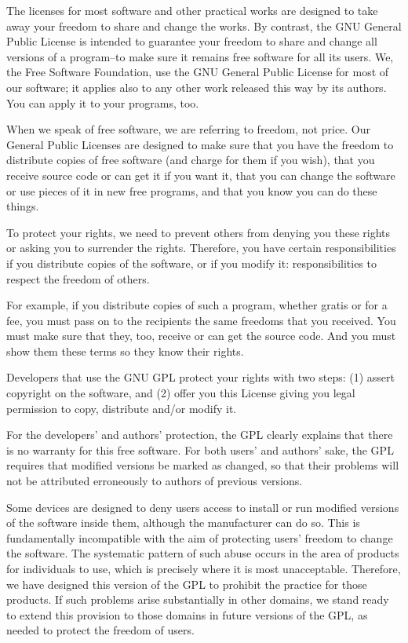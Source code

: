 \documentclass[a4paper, 11pt, twoside]{article}
\begin{document}
The licenses for most software and other practical works are designed to take away your freedom to share and change the works. By contrast, the GNU General Public License is intended to guarantee your freedom to share and change all versions of a program--to make sure it remains free software for all its users. We, the Free Software Foundation, use the GNU General Public License for most of our software; it applies also to any other work released this way by its authors. You can apply it to your programs, too.

When we speak of free software, we are referring to freedom, not price. Our General Public Licenses are designed to make sure that you have the freedom to distribute copies of free software (and charge for them if you wish), that you receive source code or can get it if you want it, that you can change the software or use pieces of it in new free programs, and that you know you can do these things.

To protect your rights, we need to prevent others from denying you these rights or asking you to surrender the rights. Therefore, you have certain responsibilities if you distribute copies of the software, or if you modify it: responsibilities to respect the freedom of others.

For example, if you distribute copies of such a program, whether gratis or for a fee, you must pass on to the recipients the same freedoms that you received. You must make sure that they, too, receive or can get the source code. And you must show them these terms so they know their rights.

Developers that use the GNU GPL protect your rights with two steps: (1) assert copyright on the software, and (2) offer you this License giving you legal permission to copy, distribute and/or modify it.

For the developers' and authors' protection, the GPL clearly explains that there is no warranty for this free software. For both users' and authors' sake, the GPL requires that modified versions be marked as changed, so that their problems will not be attributed erroneously to authors of previous versions.

Some devices are designed to deny users access to install or run modified versions of the software inside them, although the manufacturer can do so. This is fundamentally incompatible with the aim of protecting users' freedom to change the software. The systematic pattern of such abuse occurs in the area of products for individuals to use, which is precisely where it is most unacceptable. Therefore, we have designed this version of the GPL to prohibit the practice for those products. If such problems arise substantially in other domains, we stand ready to extend this provision to those domains in future versions of the GPL, as needed to protect the freedom of users.
\end{document}
